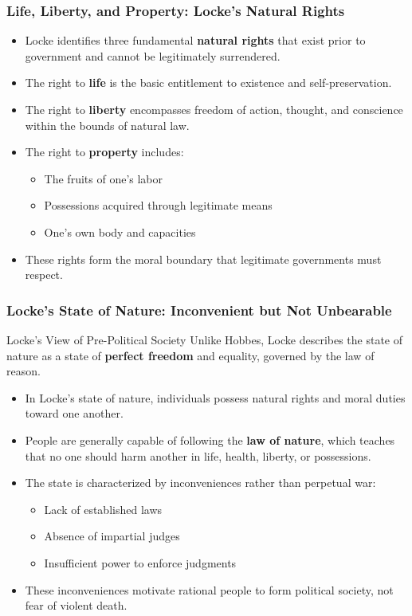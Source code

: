 \documentclass[aspectratio=169]{beamer}
\begin{document}
\begin{frame}
  \frametitle{Life, Liberty, and Property: Locke's Natural Rights}
  
  \begin{itemize}
    \item Locke identifies three fundamental \textbf{natural rights} that exist prior to government and cannot be legitimately surrendered.
    \item The right to \textbf{life} is the basic entitlement to existence and self-preservation.
    \item The right to \textbf{liberty} encompasses freedom of action, thought, and conscience within the bounds of natural law.
    \item The right to \textbf{property} includes:
      \begin{itemize}
        \item The fruits of one's labor
        \item Possessions acquired through legitimate means
        \item One's own body and capacities
      \end{itemize}
    \item These rights form the moral boundary that legitimate governments must respect.
  \end{itemize}
\end{frame}

\begin{frame}
  \frametitle{Locke's State of Nature: Inconvenient but Not Unbearable}
  
  \begin{block}{Locke's View of Pre-Political Society}
    Unlike Hobbes, Locke describes the state of nature as a state of \textbf{perfect freedom} and equality, governed by the law of reason.
  \end{block}
  
  \begin{itemize}
    \item In Locke's state of nature, individuals possess natural rights and moral duties toward one another.
    \item People are generally capable of following the \textbf{law of nature}, which teaches that no one should harm another in life, health, liberty, or possessions.
    \item The state is characterized by inconveniences rather than perpetual war:
      \begin{itemize}
        \item Lack of established laws
        \item Absence of impartial judges
        \item Insufficient power to enforce judgments
      \end{itemize}
    \item These inconveniences motivate rational people to form political society, not fear of violent death.
  \end{itemize}
\end{frame}
\end{document}
